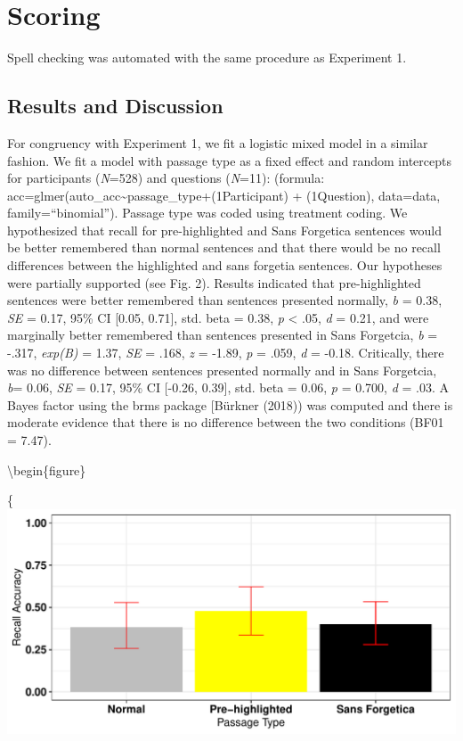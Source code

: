 \documentclass[english,doc]{apa6}
\begin{document}
\hypertarget{scoring-1}{%
\section{Scoring}\label{scoring-1}}

Spell checking was automated with the same procedure as Experiment 1.

\hypertarget{results-and-discussion-1}{%
\subsection{Results and Discussion}\label{results-and-discussion-1}}

For congruency with Experiment 1, we fit a logistic mixed model in a similar fashion. We fit a model with passage type as a fixed effect and random intercepts for participants (\emph{N}=528) and questions (\emph{N}=11): (formula: acc=glmer(auto\_acc\textasciitilde{}passage\_type+(1\textbar{}Participant) + (1\textbar{}Question), data=data, family=\enquote{binomial}). Passage type was coded using treatment coding. We hypothesized that recall for pre-highlighted and Sans Forgetica sentences would be better remembered than normal sentences and that there would be no recall differences between the highlighted and sans forgetia sentences. Our hypotheses were partially supported (see Fig. 2). Results indicated that pre-highlighted sentences were better remembered than sentences presented normally, \emph{b} = 0.38, \emph{SE} = 0.17, 95\% CI {[}0.05, 0.71{]}, std. beta = 0.38, \emph{p} \textless{} .05, \emph{d} = 0.21, and were marginally better remembered than sentences presented in Sans Forgetcia, \emph{b} = -.317, \emph{exp(B)} = 1.37, \emph{SE} = .168, \emph{z} = -1.89, \emph{p} = .059, \emph{d} = -0.18. Critically, there was no difference between sentences presented normally and in Sans Forgetcia, \emph{b}= 0.06, \emph{SE} = 0.17, 95\% CI {[}-0.26, 0.39{]}, std. beta = 0.06, \emph{p} = 0.700, \emph{d} = .03. A Bayes factor using the brms package {[}Bürkner (2018)) was computed and there is moderate evidence that there is no difference between the two conditions (BF01 = 7.47).

\textbackslash{}begin\{figure\}

\{\centering \includegraphics{SF_Paper_files/figure-latex/unnamed-chunk-3-1}
\end{document}
